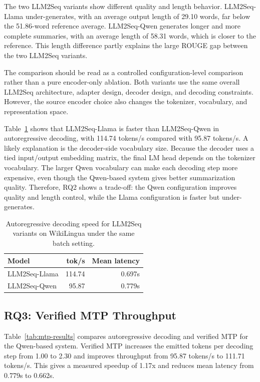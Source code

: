 \documentclass[11pt]{article}
\begin{document}
The two LLM2Seq variants show different quality and length behavior.
LLM2Seq-Llama under-generates, with an average output length of 29.10 words, far below the 51.86-word reference average.
LLM2Seq-Qwen generates longer and more complete summaries, with an average length of 58.31 words, which is closer to the reference.
This length difference partly explains the large ROUGE gap between the two LLM2Seq variants.

The comparison should be read as a controlled configuration-level comparison rather than a pure encoder-only ablation.
Both variants use the same overall LLM2Seq architecture, adapter design, decoder design, and decoding constraints.
However, the source encoder choice also changes the tokenizer, vocabulary, and representation space.

Table~\ref{tab:speed} shows that LLM2Seq-Llama is faster than LLM2Seq-Qwen in autoregressive decoding, with 114.74 tokens/s compared with 95.87 tokens/s.
A likely explanation is the decoder-side vocabulary size.
Because the decoder uses a tied input/output embedding matrix, the final LM head depends on the tokenizer vocabulary.
The larger Qwen vocabulary can make each decoding step more expensive, even though the Qwen-based system gives better summarization quality.
Therefore, RQ2 shows a trade-off: the Qwen configuration improves quality and length control, while the Llama configuration is faster but under-generates.

\begin{table}[t]
\centering
\small
\begin{tabular}{lrr}
\toprule
Model & tok/s & Mean latency \\
\midrule
LLM2Seq-Llama & 114.74 & 0.697s \\
LLM2Seq-Qwen & 95.87 & 0.779s \\
\bottomrule
\end{tabular}
\caption{Autoregressive decoding speed for LLM2Seq variants on WikiLingua under the same batch setting.}
\label{tab:speed}
\end{table}

\subsection{RQ3: Verified MTP Throughput}

Table~\ref{tab:mtp-results} compares autoregressive decoding and verified MTP for the Qwen-based system.
Verified MTP increases the emitted tokens per decoding step from 1.00 to 2.30 and improves throughput from 95.87 tokens/s to 111.71 tokens/s.
This gives a measured speedup of 1.17x and reduces mean latency from 0.779s to 0.662s.
\end{document}
